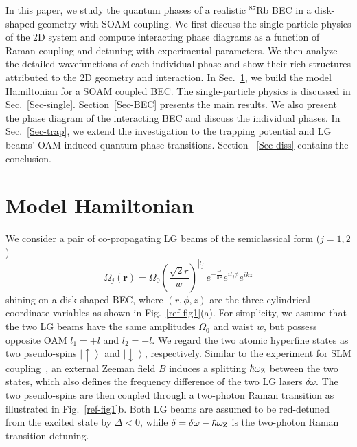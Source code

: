 \documentclass[twocolumn,pra,unsortedaddress,showpacs,floatfix,citeautoscript,nofootinbib]{revtex4-1}
\begin{document}
In this paper, we study the quantum phases of a realistic
$^{87}$Rb BEC in a disk-shaped geometry with SOAM coupling. We
first discuss the single-particle physics of the 2D system and
compute interacting phase diagrams as a function of Raman coupling
and detuning with experimental parameters. We then analyze the
detailed wavefunctions of each individual phase and show their
rich structures attributed to the 2D geometry and interaction. In
Sec.~\ref{Sec-model}, we build the model Hamiltonian for a SOAM
coupled BEC. The single-particle physics is discussed in
Sec.~\ref{Sec-single}. Section~\ref{Sec-BEC} presents the main
results. We also present the phase diagram of the interacting BEC
and discuss the individual phases. In Sec.~\ref{Sec-trap}, we
extend the investigation to the trapping potential and LG beams'
OAM-induced quantum phase transitions. Section~ \ref{Sec-diss}
contains the conclusion.

\vspace{-0.3cm}
\section{Model Hamiltonian}\label{Sec-model}
\vspace{-0.3cm}
We consider a pair of co-propagating LG beams of
the semiclassical form ($j=1,2$)
\begin{equation}
\Omega _{j}(\mathbf{r})=\Omega _{0}\left(
\frac{\sqrt{2}r}{w}\right) ^{\left | l_{j} \right
|}e^{-\frac{r^{2}}{w^{2}}}e^{il_{j}\phi }e^{ikz}
\end{equation}
shining on a disk-shaped BEC, where $(r,\phi ,z)$ are the three
cylindrical coordinate variables as shown in
Fig.~\ref{ref-fig1}(a). For simplicity, we assume that the two LG
beams have the same amplitudes $\Omega _{0}$ and waist $w$, but
possess opposite OAM $l_{1}=+l$ and $l_{2}=-l$. We regard the two
atomic hyperfine states as two pseudo-spins $\left|\uparrow
\right\rangle $ and $\left|\downarrow \right\rangle $,
respectively. Similar to the experiment for SLM
coupling~\cite{Lin2011}, an external Zeeman field $B$ induces a
splitting $\hbar \omega _{\rm {Z}}$ between the two states, which
also defines the frequency difference of the two LG lasers $\delta
\omega $. The two pseudo-spins are then coupled through a
two-photon Raman transition as illustrated in
Fig.~\ref{ref-fig1}b. Both LG beams are assumed to be red-detuned
from the excited state by $\Delta <0 $, while $\delta =\delta
\omega -\hbar \omega _{\rm{Z}}$ is the two-photon Raman transition
detuning.
\end{document}
